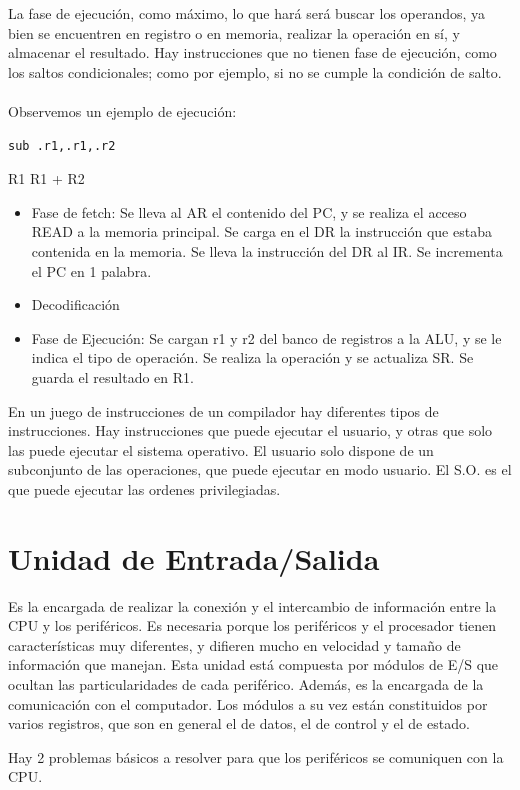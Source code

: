 \documentclass[a4paper,11pt,spanish]{report}
\begin{document}
La fase de ejecución, como máximo, lo que hará será buscar los operandos, ya bien se encuentren en registro o en memoria, realizar la operación en sí, y almacenar el resultado. Hay instrucciones que no tienen fase de ejecución, como los saltos condicionales; como por ejemplo, si no se cumple la condición de salto.
\\\\
Observemos un ejemplo de ejecución:
\begin{verbatim}
sub .r1,.r1,.r2
\end{verbatim}
R1 \textleftarrow R1 + R2
\begin{itemize}
\item Fase de fetch: 
\subitem Se lleva al AR el contenido del PC, y se realiza el acceso READ a la memoria principal. 
\subitem Se carga en el DR la instrucción que estaba contenida en la memoria.
\subitem Se lleva la instrucción del DR al IR.
\subitem Se incrementa el PC en 1 palabra.
\item Decodificación
\item Fase de Ejecución:
\subitem Se cargan r1 y r2 del banco de registros a la ALU, y se le indica el tipo de operación.
\subitem Se realiza la operación y se actualiza SR.
\subitem Se guarda el resultado en R1.
\end{itemize}

En un juego de instrucciones de un compilador hay diferentes tipos de instrucciones. Hay instrucciones que puede ejecutar el usuario, y otras que solo las puede ejecutar el sistema operativo. El usuario solo dispone de un subconjunto de las operaciones, que puede ejecutar en modo usuario. El S.O. es el que puede ejecutar las ordenes privilegiadas.

\section{Unidad de Entrada/Salida}
Es la encargada de realizar la conexión y el intercambio de información entre la CPU y los periféricos. Es necesaria porque los periféricos y el procesador tienen características muy diferentes, y difieren mucho en velocidad y tamaño de información que manejan. Esta unidad está compuesta por módulos de E/S que ocultan las particularidades de cada periférico. Además, es la encargada de la comunicación con el computador. Los módulos a su vez están constituidos por varios registros, que son en general el de datos, el de control y el de estado.

Hay 2 problemas básicos a resolver para que los periféricos se comuniquen con la CPU.
\end{document}
